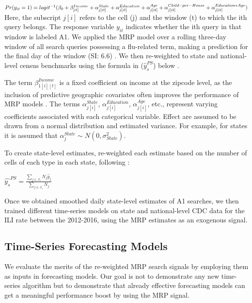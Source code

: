 \documentclass[fleqn,10pt]{wlscirep}
\begin{document}
$Pr(y_{it} = 1) = logit^{-1}( \beta_0  + \beta_{[it]}^{Income}
+ \alpha_{j[it]}^{State}  
+ \alpha_{j[it]}^{Education}  
+ \alpha_{j[it]}^{Age} \\
+ \alpha_{j[it]}^{Child-per-House}
+ \alpha_{j[it]}^{Education*Age} )$
\\

Here, the subscript $j[i]$ refers to the cell (j) and the window (t) to which the ith query belongs. The response variable $y_{it}$ indicates whether the ith query in that window is labeled A1. We applied the MRP model over a rolling three-day window of all search queries possessing a flu-related term, making a prediction for the final day of the window (SI: 6.6) \cite{bates_etal_2015}. We then re-weighted to state and national-level census benchmarks using the formula in ($\hat{y}_s^{PS}$) below \cite{wang2015forecasting}. 

The term $\beta_{1[i][t]}^{Income}$ is a fixed coefficient on income at the zipcode level, as the inclusion of predictive geographic covariates often improves the performance of MRP models \cite{buttice_and_highton_2013}. The terms $\alpha_{j[i]}^{State}$,  $\alpha_{j[i]}^{Education}$,  $\alpha_{j[i]}^{Age}$, etc., represent varying coefficients associated with each categorical variable. Effect are assumed to be drawn from a normal distribution and estimated variance. For example, for states it is assumed that $\alpha_j^{State} \sim  N (0, \sigma_{State}^2)$.  

To create state-level estimates, re-weighted each estimate based on the number of cells of each type in each state, following \cite{wang2015forecasting}:

$\hat{y_s}^{PS} = 
\frac{ \sum_{ j \in J_s } N_j \hat{y}_j }{\sum_{ j \in J_s } N_j}$

Once we obtained smoothed daily state-level estimates of A1 searches, we then trained different time-series models on state and national-level CDC data for the ILI rate between the 2012-2016, using the MRP estimates as an exogenous signal.

\subsection*{Time-Series Forecasting Models}

We evaluate the merits of the re-weighted MRP search signals by employing them as inputs in forecasting models. Our goal is not to demonstrate any new time-series algorithm but to demonstrate that already effective forecasting models can get a meaningful performance boost by using the MRP signal. 
\end{document}
